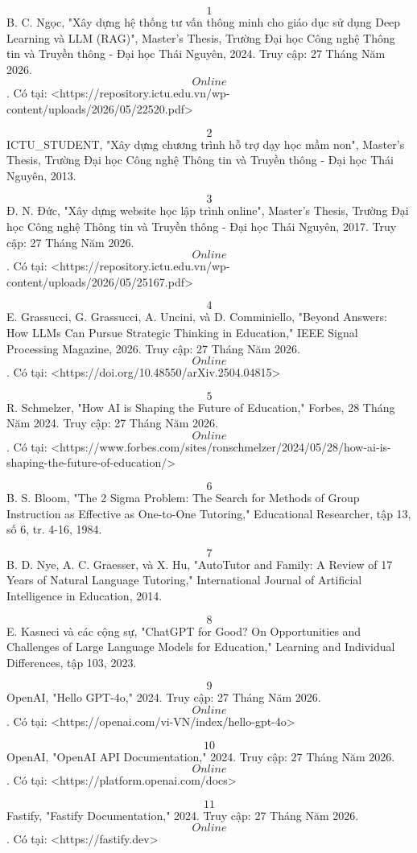 \documentclass[../main.tex]{subfiles}
\begin{document}
\[1\] B. C. Ngọc, "Xây dựng hệ thống tư vấn thông minh cho giáo dục sử dụng Deep Learning và LLM (RAG)", Master's Thesis, Trường Đại học Công nghệ Thông tin và Truyền thông - Đại học Thái Nguyên, 2024. Truy cập: 27 Tháng Năm 2026. \[Online\]. Có tại: <https://repository.ictu.edu.vn/wp-content/uploads/2026/05/22520.pdf>

\[2\] ICTU\_STUDENT, "Xây dựng chương trình hỗ trợ dạy học mầm non", Master's Thesis, Trường Đại học Công nghệ Thông tin và Truyền thông - Đại học Thái Nguyên, 2013.

\[3\] Đ. N. Đức, "Xây dựng website học lập trình online", Master's Thesis, Trường Đại học Công nghệ Thông tin và Truyền thông - Đại học Thái Nguyên, 2017. Truy cập: 27 Tháng Năm 2026. \[Online\]. Có tại: <https://repository.ictu.edu.vn/wp-content/uploads/2026/05/25167.pdf>

\[4\] E. Grassucci, G. Grassucci, A. Uncini, và D. Comminiello, "Beyond Answers: How LLMs Can Pursue Strategic Thinking in Education," IEEE Signal Processing Magazine, 2026. Truy cập: 27 Tháng Năm 2026. \[Online\]. Có tại: <https://doi.org/10.48550/arXiv.2504.04815>

\[5\] R. Schmelzer, "How AI is Shaping the Future of Education," Forbes, 28 Tháng Năm 2024. Truy cập: 27 Tháng Năm 2026. \[Online\]. Có tại: <https://www.forbes.com/sites/ronschmelzer/2024/05/28/how-ai-is-shaping-the-future-of-education/>

\[6\] B. S. Bloom, "The 2 Sigma Problem: The Search for Methods of Group Instruction as Effective as One-to-One Tutoring," Educational Researcher, tập 13, số 6, tr. 4-16, 1984.

\[7\] B. D. Nye, A. C. Graesser, và X. Hu, "AutoTutor and Family: A Review of 17 Years of Natural Language Tutoring," International Journal of Artificial Intelligence in Education, 2014.

\[8\] E. Kasneci và các cộng sự, "ChatGPT for Good? On Opportunities and Challenges of Large Language Models for Education," Learning and Individual Differences, tập 103, 2023.

\[9\] OpenAI, "Hello GPT-4o," 2024. Truy cập: 27 Tháng Năm 2026. \[Online\]. Có tại: <https://openai.com/vi-VN/index/hello-gpt-4o>

\[10\] OpenAI, "OpenAI API Documentation," 2024. Truy cập: 27 Tháng Năm 2026. \[Online\]. Có tại: <https://platform.openai.com/docs>

\[11\] Fastify, "Fastify Documentation," 2024. Truy cập: 27 Tháng Năm 2026. \[Online\]. Có tại: <https://fastify.dev>
\end{document}
